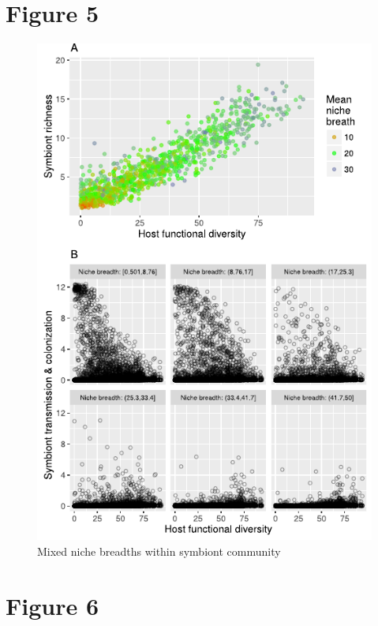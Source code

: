 \documentclass[12pt]{article}
\begin{document}
\newpage

\section*{Figure 5}

\begin{figure}[ht]\centering
\includegraphics[width=\linewidth]{fig/fig4.pdf}
\caption{Mixed niche breadths within symbiont community}
\label{f5}
\end{figure}

\newpage

\section*{Figure 6}
\end{document}
